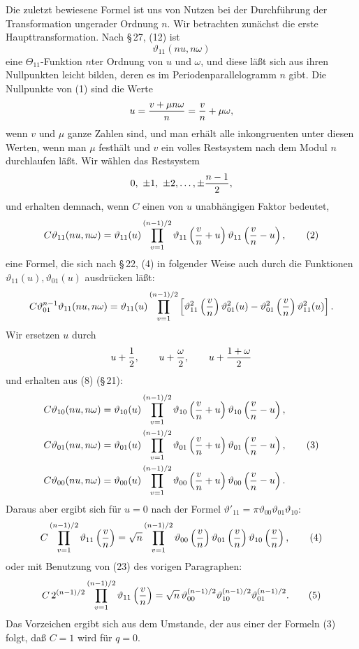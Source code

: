 \documentclass[11pt]{article}
\providecommand{\tht}{\vartheta}
\begin{document}
Die zuletzt bewiesene Formel ist uns von Nutzen bei der Durchführung der Transformation ungerader Ordnung $n$. Wir betrachten zunächst die erste Haupttransformation. Nach \S\,27, (12) ist
\begin{equation}
\tht_{11}(nu,n\omega) \tag{1}
\end{equation}
eine $\Theta_{11}$-Funktion $n$ter Ordnung von $u$ und $\omega$, und diese läßt sich aus ihren Nullpunkten leicht bilden, deren es im Periodenparallelogramm $n$ gibt. Die Nullpunkte von (1) sind die Werte
\[
u={v+\mu n\omega\over n}={v\over n}+\mu\omega,
\]
wenn $v$ und $\mu$ ganze Zahlen sind, und man erhält alle inkongruenten unter diesen Werten, wenn man $\mu$ festhält und $v$ ein volles Restsystem nach dem Modul $n$ durchlaufen läßt. Wir wählen das Restsystem
\[
0,\ \pm1,\ \pm2,\ldots,\pm{n-1\over2},
\]
und erhalten demnach, wenn $C$ einen von $u$ unabhängigen Faktor bedeutet,
\begin{equation}
C\tht_{11}(nu,n\omega)=\tht_{11}(u)\prod_{v=1}^{(n-1)/2}
\tht_{11}\left({v\over n}+u\right)
\tht_{11}\left({v\over n}-u\right), \tag{2}
\end{equation}
eine Formel, die sich nach \S\,22, (4) in folgender Weise auch durch die Funktionen $\tht_{11}(u),\tht_{01}(u)$ ausdrücken läßt:
\[
C\tht_{01}^{n-1}\tht_{11}(nu,n\omega)
=\tht_{11}(u)\prod_{v=1}^{(n-1)/2}
\left[\tht_{11}^2\left({v\over n}\right)\tht_{01}^2(u)-\tht_{01}^2\left({v\over n}\right)\tht_{11}^2(u)\right].
\]
Wir ersetzen $u$ durch
\[
u+{1\over2},\qquad u+{\omega\over2},\qquad u+{1+\omega\over2}
\]
und erhalten aus (8) (\S\,21):
\begin{align}
C\tht_{10}(nu,n\omega)&=\tht_{10}(u)\prod_{v=1}^{(n-1)/2}
\tht_{10}\left({v\over n}+u\right)
\tht_{10}\left({v\over n}-u\right),\notag\\
C\tht_{01}(nu,n\omega)&=\tht_{01}(u)\prod_{v=1}^{(n-1)/2}
\tht_{01}\left({v\over n}+u\right)
\tht_{01}\left({v\over n}-u\right), \tag{3}\\
C\tht_{00}(nu,n\omega)&=\tht_{00}(u)\prod_{v=1}^{(n-1)/2}
\tht_{00}\left({v\over n}+u\right)
\tht_{00}\left({v\over n}-u\right).\notag
\end{align}
Daraus aber ergibt sich für $u=0$ nach der Formel $\tht'_{11}=\pi\tht_{00}\tht_{01}\tht_{10}$:
\begin{equation}
C\prod_{v=1}^{(n-1)/2}\tht_{11}\left({v\over n}\right)
=\sqrt n\prod_{v=1}^{(n-1)/2}
\tht_{00}\left({v\over n}\right)\tht_{01}\left({v\over n}\right)\tht_{10}\left({v\over n}\right), \tag{4}
\end{equation}
oder mit Benutzung von (23) des vorigen Paragraphen:
\begin{equation}
C\,2^{(n-1)/2}\prod_{v=1}^{(n-1)/2}\tht_{11}\left({v\over n}\right)
=\sqrt n\,\tht_{00}^{(n-1)/2}\tht_{10}^{(n-1)/2}\tht_{01}^{(n-1)/2}. \tag{5}
\end{equation}
Das Vorzeichen ergibt sich aus dem Umstande, der aus einer der Formeln (3) folgt, daß $C=1$ wird für $q=0$.
\end{document}
